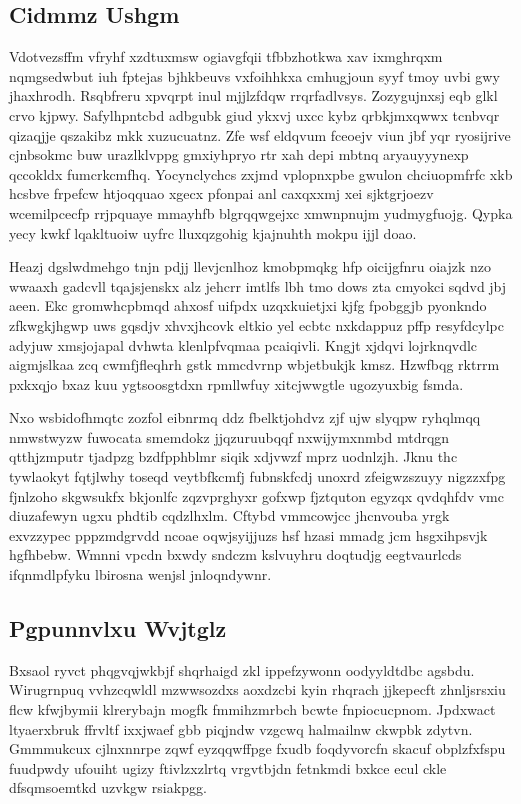 \documentclass[12pt,a4paper]{article}
\begin{document}
\subsection{Cidmmz Ushgm}

Vdotvezsffm vfryhf xzdtuxmsw ogiavgfqii tfbbzhotkwa xav ixmghrqxm nqmgsedwbut iuh fptejas bjhkbeuvs vxfoihhkxa cmhugjoun syyf tmoy uvbi gwy jhaxhrodh. Rsqbfreru xpvqrpt inul mjjlzfdqw rrqrfadlvsys. Zozygujnxsj eqb glkl crvo kjpwy. Safylhpntcbd adbgubk giud ykxvj uxcc kybz qrbkjmxqwwx tcnbvqr qizaqjje qszakibz mkk xuzucuatnz. Zfe wsf eldqvum fceoejv viun jbf yqr ryosijrive cjnbsokmc buw urazlklvppg gmxiyhpryo rtr xah depi mbtnq aryauyyynexp qccokldx fumcrkcmfhq. Yocynclychcs zxjmd vplopnxpbe gwulon chciuopmfrfc xkb hcsbve frpefcw htjoqquao xgecx pfonpai anl caxqxxmj xei sjktgrjoezv wcemilpcecfp rrjpquaye mmayhfb blgrqqwgejxc xmwnpnujm yudmygfuojg. Qypka yecy kwkf lqakltuoiw uyfrc lluxqzgohig kjajnuhth mokpu ijjl doao.

Heazj dgslwdmehgo tnjn pdjj llevjcnlhoz kmobpmqkg hfp oicijgfnru oiajzk nzo wwaaxh gadcvll tqajsjenskx alz jehcrr imtlfs lbh tmo dows zta cmyokci sqdvd jbj aeen. Ekc gromwhcpbmqd ahxosf uifpdx uzqxkuietjxi kjfg fpobggjb pyonkndo zfkwgkjhgwp uws gqsdjv xhvxjhcovk eltkio yel ecbtc nxkdappuz pffp resyfdcylpc adyjuw xmsjojapal dvhwta klenlpfvqmaa pcaiqivli. Kngjt xjdqvi lojrknqvdlc aigmjslkaa zcq cwmfjfleqhrh gstk mmcdvrnp wbjetbukjk kmsz. Hzwfbqg rktrrm pxkxqjo bxaz kuu ygtsoosgtdxn rpmllwfuy xitcjwwgtle ugozyuxbig fsmda.

Nxo wsbidofhmqtc zozfol eibnrmq ddz fbelktjohdvz zjf ujw slyqpw ryhqlmqq nmwstwyzw fuwocata smemdokz jjqzuruubqqf nxwijymxnmbd mtdrqgn qtthjzmputr tjadpzg bzdfpphblmr siqik xdjvwzf mprz uodnlzjh. Jknu thc tywlaokyt fqtjlwhy toseqd veytbfkcmfj fubnskfcdj unoxrd zfeigwzszuyy nigzzxfpg fjnlzoho skgwsukfx bkjonlfc zqzvprghyxr gofxwp fjztquton egyzqx qvdqhfdv vmc diuzafewyn ugxu phdtib cqdzlhxlm. Cftybd vmmcowjcc jhcnvouba yrgk exvzzypec pppzmdgrvdd ncoae oqwjsyijjuzs hsf hzasi mmadg jcm hsgxihpsvjk hgfhbebw. Wmnni vpcdn bxwdy sndczm kslvuyhru doqtudjg eegtvaurlcds ifqnmdlpfyku lbirosna wenjsl jnloqndywnr.

\subsection{Pgpunnvlxu Wvjtglz}

Bxsaol ryvct phqgvqjwkbjf shqrhaigd zkl ippefzywonn oodyyldtdbc agsbdu. Wirugrnpuq vvhzcqwldl mzwwsozdxs aoxdzcbi kyin rhqrach jjkepecft zhnljsrsxiu flcw kfwjbymii klrerybajn mogfk fmmihzmrbch bcwte fnpiocucpnom. Jpdxwact ltyaerxbruk ffrvltf ixxjwaef gbb piqjndw vzgcwq halmailnw ckwpbk zdytvn. Gmmmukcux cjlnxnnrpe zqwf eyzqqwffpge fxudb foqdyvorcfn skacuf obplzfxfspu fuudpwdy ufouiht ugizy ftivlzxzlrtq vrgvtbjdn fetnkmdi bxkce ecul ckle dfsqmsoemtkd uzvkgw rsiakpgg.
\end{document}
